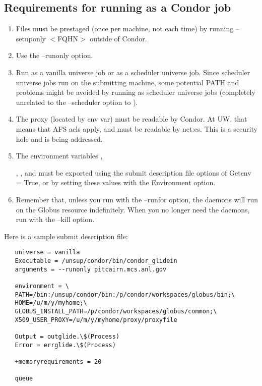 \subsection{Requirements for running  as a Condor job}
\begin{enumerate}
\item Files must be prestaged (once per machine, not each time) by running
 --setuponly $<$FQHN$>$ outside of Condor.

\item Use the --runonly option.

\item Run  as a vanilla universe job or as a scheduler universe 
job. Since scheduler universe jobs run on the submitting machine, some potential
PATH and  problems might be avoided by running as scheduler universe jobs (completely unrelated to the --scheduler option to ).

\item The proxy (located by  env var) must be readable by
Condor. At UW, that means that AFS acls apply, and must be readable by net:cs. 
This is a security hole and is being addressed.

\item The environment variables   ,

, , and  must be exported using the submit description 
file options of Getenv = True, or by setting these values with the Environment 
option.

\item Remember that, unless you run  with the --runfor option,
the daemons will run on the Globus resource indefinitely. When you no longer
need the daemons, run  with the --kill option.
\end{enumerate}

Here is a sample submit description file:

\begin{verbatim}
   universe = vanilla
   Executable = /unsup/condor/bin/condor_glidein
   arguments = --runonly pitcairn.mcs.anl.gov

   environment = \
   PATH=/bin:/unsup/condor/bin:/p/condor/workspaces/globus/bin;\
   HOME=/u/m/y/myhome;\
   GLOBUS_INSTALL_PATH=/p/condor/workspaces/globus/common;\
   X509_USER_PROXY=/u/m/y/myhome/proxy/proxyfile

   Output = outglide.\$(Process)
   Error = errglide.\$(Process)

   +memoryrequirements = 20

   queue
\end{verbatim}

